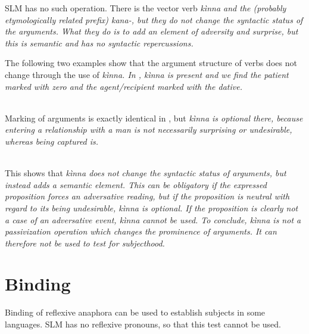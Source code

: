 SLM has no such operation. There is the vector verb \em kìnna \em and the (probably etymologically related prefix) \em kana-\em, but they do not change the syntactic status of the arguments. What they do is to add an element of adversity and surprise, but this is semantic and has no syntactic repercussions.

The following two examples show that the argument structure of verbs does not change through the use of \em kìnna\em. In , \em kìnna \em is present and we find the patient marked with zero and the agent/recipient marked with the dative.


\\

Marking of arguments is exactly identical in , but  \em kìnna \em is optional there, because entering a relationship with a man is not necessarily surprising or undesirable, whereas being captured is.

 \\

This shows that \em kìnna \em does not change the syntactic status of arguments, but instead adds a semantic element. This can be obligatory if the expressed proposition forces an adversative reading, but if the proposition is neutral with regard to its being undesirable, \em kìnna \em is optional. If the proposition is clearly not a case of an adversative event, \em kìnna \em cannot be used. To conclude, \em kìnna \em is not a passivization operation which changes the prominence of arguments. It can therefore not be used to test for subjecthood.

\section{Binding}\label{sec:grel:Binding}
Binding of reflexive anaphora can be used to establish subjects in some languages. SLM has no reflexive pronouns, so that this test cannot be used.

